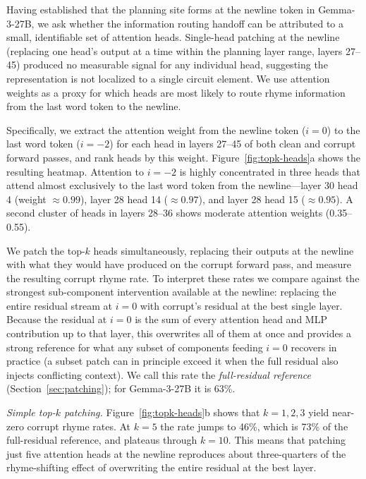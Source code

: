 \documentclass{article}
\begin{document}
Having established that the planning site forms at the newline token in Gemma-3-27B, we ask whether the information routing handoff can be attributed to a small, identifiable set of attention heads. Single-head patching at the newline (replacing one head's output at a time within the planning layer range, layers 27--45) produced no measurable signal for any individual head, suggesting the representation is not localized to a single circuit element. We use attention weights as a proxy for which heads are most likely to route rhyme information from the last word token to the newline.

Specifically, we extract the attention weight from the newline token ($i=0$) to the last word token ($i=-2$) for each head in layers 27--45 of both clean and corrupt forward passes, and rank heads by this weight. Figure~\ref{fig:topk-heads}a shows the resulting heatmap. Attention to $i=-2$ is highly concentrated in three heads that attend almost exclusively to the last word token from the newline---layer 30 head 4 (weight ${\approx}0.99$), layer 28 head 14 (${\approx}0.97$), and layer 28 head 15 (${\approx}0.95$). A second cluster of heads in layers 28--36 shows moderate attention weights (0.35--0.55).

We patch the top-$k$ heads simultaneously, replacing their outputs at the newline with what they would have produced on the corrupt forward pass, and measure the resulting corrupt rhyme rate. To interpret these rates we compare against the strongest sub-component intervention available at the newline: replacing the entire residual stream at $i{=}0$ with corrupt's residual at the best single layer. Because the residual at $i{=}0$ is the sum of every attention head and MLP contribution up to that layer, this overwrites all of them at once and provides a strong reference for what any subset of components feeding $i{=}0$ recovers in practice (a subset patch can in principle exceed it when the full residual also injects conflicting context). We call this rate the \textit{full-residual reference} (Section~\ref{sec:patching}); for Gemma-3-27B it is 63\%.

\textit{Simple top-$k$ patching.} Figure~\ref{fig:topk-heads}b shows that $k=1,2,3$ yield near-zero corrupt rhyme rates. At $k=5$ the rate jumps to 46\%, which is 73\% of the full-residual reference, and plateaus through $k=10$. This means that patching just five attention heads at the newline reproduces about three-quarters of the rhyme-shifting effect of overwriting the entire residual at the best layer.
\end{document}
